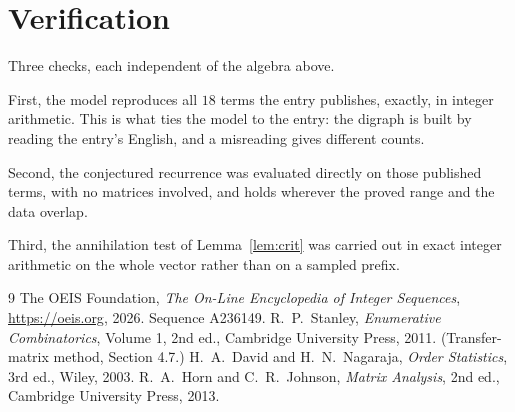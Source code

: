 \documentclass[11pt,a4paper]{article}
\theoremstyle{plain}
\theoremstyle{definition}
\begin{document}
\section{Verification}

Three checks, each independent of the algebra above.

First, the model reproduces all $18$ terms the entry publishes, exactly, in integer
arithmetic. This is what ties the model to the entry: the digraph is built by reading the
entry's English, and a misreading gives different counts.

Second, the conjectured recurrence was evaluated directly on those published terms, with no
matrices involved, and holds wherever the proved range and the data overlap.

Third, the annihilation test of Lemma~\ref{lem:crit} was carried out in exact integer
arithmetic on the whole vector rather than on a sampled prefix.

\begin{thebibliography}{9}
 The OEIS Foundation, \emph{The On-Line Encyclopedia of Integer
Sequences}, \url{https://oeis.org}, 2026. Sequence A236149.
 R.~P.~Stanley, \emph{Enumerative Combinatorics}, Volume 1, 2nd ed.,
Cambridge University Press, 2011. (Transfer-matrix method, Section 4.7.)
 H.~A.~David and H.~N.~Nagaraja, \emph{Order Statistics}, 3rd ed., Wiley,
2003.
 R.~A.~Horn and C.~R.~Johnson, \emph{Matrix Analysis}, 2nd ed., Cambridge
University Press, 2013.
\end{thebibliography}
\end{document}
